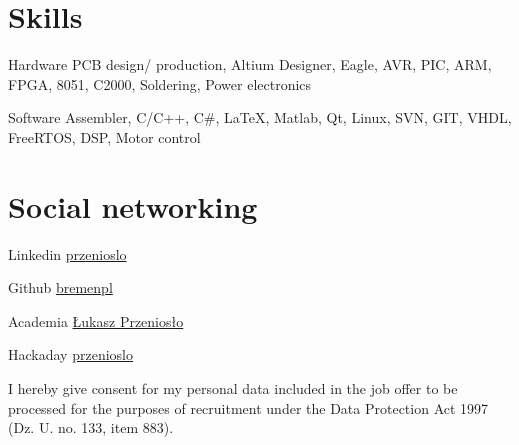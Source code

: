 \documentclass{tccv}
\begin{document}
\section{Skills}

\begin{factlist}

\item{Hardware}
     {PCB design/ production, Altium Designer, Eagle, AVR, PIC, ARM, FPGA, 8051, C2000, Soldering, Power electronics}

\item{Software}
     {Assembler, C/C++, C\#, \LaTeX, Matlab, Qt, Linux, SVN, GIT, VHDL, FreeRTOS, DSP, Motor control}

\end{factlist}

\section{Social networking}

\begin{factlist}

\item{Linkedin}
     {\href{http://pl.linkedin.com/in/przenioslo}{przenioslo}}
     
\item{Github}
     {\href{http://github.com/bremenpl}{bremenpl}}
     
\item{Academia}
     {\href{https://zut.academia.edu/\%C5\%81ukaszPrzenios\%C5\%82o}{Łukasz Przeniosło}}
     
\item{Hackaday}
     {\href{http://hackaday.io/przenioslo}{przenioslo}}  

\end{factlist} 

\vspace*{\fill} %

{\scriptsize I hereby give consent for my personal data included in the job offer to be processed for the purposes of recruitment under the Data Protection Act 1997 (Dz. U. no. 133, item 883).}
\end{document}
